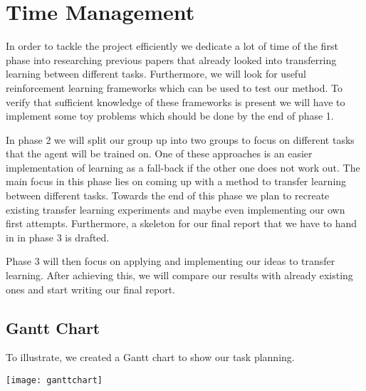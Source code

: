 \section{Time Management}
\label{sec:time}
In order to tackle the project efficiently we dedicate a lot of time of the first phase into researching previous papers that already looked into transferring learning between different tasks. Furthermore, we will look for useful reinforcement learning frameworks which can be used to test our method. To verify that sufficient knowledge of these frameworks is present we will have to implement some toy problems which should be done by the end of phase 1. 


In phase 2 we will split our group up into two groups to focus on different tasks that the agent will be trained on. One of these approaches is an easier implementation of learning as a fall-back if the other one does not work out. The main focus in this phase lies on coming up with a method to transfer learning between different tasks. Towards the end of this phase we plan to recreate existing transfer learning experiments and maybe even implementing our own first attempts. Furthermore, a skeleton for our final report that we have to hand in in phase 3 is drafted.


Phase 3 will then focus on applying and implementing our ideas to transfer learning. After achieving this, we will compare our results with already existing ones and start writing our final report.

\subsection{Gantt Chart}
To illustrate, we created a Gantt chart to show our task planning.

\noindent
\texttt{[image: ganttchart]}

